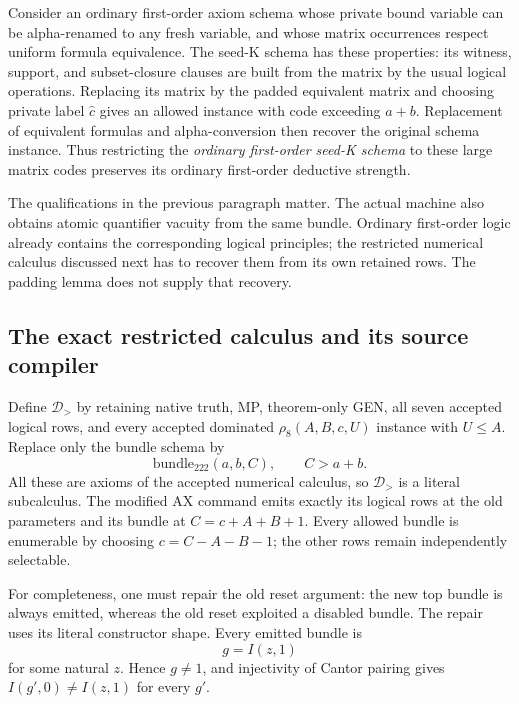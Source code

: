 Consider an ordinary first-order axiom schema whose private bound
variable can be alpha-renamed to any fresh variable, and whose matrix
occurrences respect uniform formula equivalence. The seed-K schema has
these properties: its witness, support, and subset-closure clauses are
built from the matrix by the usual logical operations. Replacing its
matrix by the padded equivalent matrix and choosing private label
\(\widehat c\) gives an allowed instance with code exceeding \(a+b\).
Replacement of equivalent formulas and alpha-conversion then recover
the original schema instance. Thus restricting the \emph{ordinary
first-order seed-K schema} to these large matrix codes preserves its
ordinary first-order deductive strength.

The qualifications in the previous paragraph matter. The actual machine
also obtains atomic quantifier vacuity from the same bundle. Ordinary
first-order logic already contains the corresponding logical principles;
the restricted numerical calculus discussed next has to recover them
from its own retained rows. The padding lemma does not supply that
recovery.

\subsection{The exact restricted calculus and its source compiler}

Define \(\mathcal D_{>}\) by retaining native truth, MP, theorem-only
GEN, all seven accepted logical rows, and every accepted dominated
\(\rho_8(A,B,c,U)\) instance with \(U\leq A\). Replace only the bundle
schema by
\[
          \mathrm{bundle}_{222}(a,b,C),\qquad C>a+b.
\]
All these are axioms of the accepted numerical calculus, so
\(\mathcal D_{>}\) is a literal subcalculus. The modified AX command
emits exactly its logical rows at the old parameters and its bundle at
\(C=c+A+B+1\). Every allowed bundle is enumerable by choosing
\(c=C-A-B-1\); the other rows remain independently selectable.

For completeness, one must repair the old reset argument: the new top
bundle is always emitted, whereas the old reset exploited a disabled
bundle. The repair uses its literal constructor shape. Every emitted
bundle is
\[
                         g=I(z,1)
\]
for some natural \(z\). Hence \(g\ne1\), and injectivity of Cantor
pairing gives \(I(g',0)\ne I(z,1)\) for every \(g'\).

